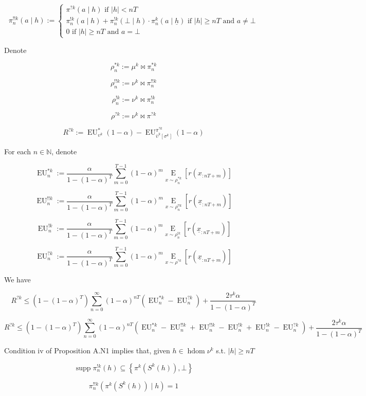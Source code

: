 \documentclass[a4paper]{article}
\DeclareMathOperator{\Supp}{supp}
\newcommand{\AP}[1]{\left(#1\right)}
\newcommand{\AB}[1]{\left[#1\right]}
\newcommand{\AC}[1]{\left\{#1\right\}}
\newcommand{\E}[1]{\underset{#1}{\operatorname{E}}}
\newcommand{\Nats}{\mathbb{N}}
\newcommand{\Abs}[1]{\left\vert #1 \right\vert}
\DeclareMathOperator{\HD}{hdom}
\newcommand{\EU}{\operatorname{EU}}
\begin{document}
$$\pi^{!!k}_n(a \mid h):=\begin{cases} \pi^{?k}(a \mid h) \text{ if } \Abs{h} < nT \\ \pi^{!k}_n(a \mid h) + \pi^{!k}_n(\bot \mid h) \cdot \pi^k_n\left(a \mid \underline{h}\right) \text{ if } \Abs{h} \geq nT \text{ and } a \ne \bot \\ 0 \text{ if } \Abs{h} \geq nT \text{ and } a = \bot \end{cases}$$

Denote 

$$\rho^{*k}_n:=\mu^k\bowtie\pi^{*k}_n$$

$$\rho^{!!k}_n:=\nu^k\bowtie\pi^{!!k}_n$$ 

$$\rho^{!k}_n:=\nu^k\bowtie\pi^{!k}_n$$ 

$$\rho^{?k}:=\nu^k\bowtie\pi^{?k}$$ 

$$R^{?k}:=\EU^{*}_{\upsilon^k}(1-\alpha)-\EU^{\pi^{?k}}_{\bar{\upsilon}^k\AB{\sigma^k}}(1-\alpha)$$

For each $n \in \Nats$, denote

$$\EU_n^{*k}:=\frac{\alpha}{1-(1-\alpha)^T}\sum_{m=0}^{T-1} (1-\alpha)^{m}\E{x\sim\rho^{*k}_n}\left[r\left(x_{:nT+m}\right)\right]$$

$$\EU_n^{!!k}:=\frac{\alpha}{1-(1-\alpha)^T}\sum_{m=0}^{T-1} (1-\alpha)^{m}\E{x\sim\rho^{!!k}_n}\left[r\left(\underline{x}_{:nT+m}\right)\right]$$

$$\EU_n^{!k}:=\frac{\alpha}{1-(1-\alpha)^T}\sum_{m=0}^{T-1} (1-\alpha)^{m}\E{x\sim\rho^{!k}_n}\left[r\left(\underline{x}_{:nT+m}\right)\right]$$

$$\EU_n^{?k}:=\frac{\alpha}{1-(1-\alpha)^T}\sum_{m=0}^{T-1} (1-\alpha)^{m}\E{x\sim\rho^{?k}}\left[r\left(\underline{x}_{:nT+m}\right)\right]$$

We have

$$R^{?k} \leq (1-(1-\alpha)^T)\sum_{n=0}^\infty (1-\alpha)^{nT} \left(\EU^{*k}_n-\EU^{?k}_n\right) + \frac{2\tau^k\alpha}{1-(1-\alpha)^T}$$

$$R^{?k} \leq  (1-(1-\alpha)^T)\sum_{n=0}^\infty (1-\alpha)^{nT} \left(\EU^{*k}_n-\EU^{!!k}_n+\EU^{!!k}_n-\EU^{!k}_n+\EU^{!k}_n-\EU^{?k}_n\right) + \frac{2\tau^k\alpha}{1-(1-\alpha)^T}$$

Condition iv of Proposition A.N1 implies that, given $h \in \HD{\nu^k}$ s.t. $\Abs{h} \geq nT$

$$\Supp{\pi^{!k}_n(h)} \subseteq \AC{\pi^k\AP{S^k(h)},\bot}$$

$$\pi^{!!k}_n\AP{\pi^k\AP{S^k(h)} \mid h} = 1$$
\end{document}
